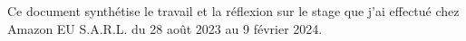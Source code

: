\begin{minipage}{0.5\textwidth}
    \\
    \\
    \\
\end{minipage}
\begin{minipage}{0.5\textwidth}
    \\
    \\
\end{minipage}

\vspace{2cm}

\begin{myabstract}
Ce document synthétise le travail et la réflexion sur le stage que j'ai effectué chez Amazon EU S.A.R.L. du 28 août 2023 au 9 février 2024.\\
\end{myabstract}

\clearpage
